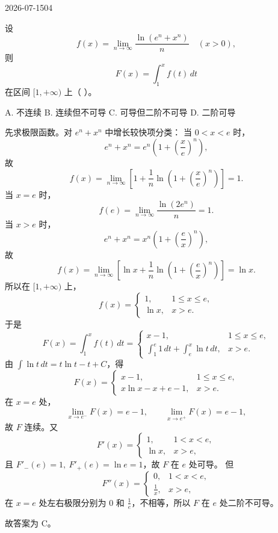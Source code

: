 \begin{mistake}{2026-07-15}{04}

\begin{problemcontent}
设
\[
f(x)=\lim_{n\to\infty}\frac{\ln(e^n+x^n)}{n}\quad (x>0),
\]
则
\[
F(x)=\int_1^x f(t)\,dt
\]
在区间 \([1,+\infty)\) 上（ ）。

A. 不连续 \quad
B. 连续但不可导 \quad
C. 可导但二阶不可导 \quad
D. 二阶可导
\end{problemcontent}

\begin{solutioncontent}
先求极限函数。对 \(e^n+x^n\) 中增长较快项分类：
当 \(0<x<e\) 时，
\[
e^n+x^n=e^n\left(1+\left(\frac{x}{e}\right)^n\right),
\]
故
\[
f(x)=\lim_{n\to\infty}\left[1+\frac1n\ln\left(1+\left(\frac{x}{e}\right)^n\right)\right]=1.
\]
当 \(x=e\) 时，
\[
f(e)=\lim_{n\to\infty}\frac{\ln(2e^n)}{n}=1.
\]
当 \(x>e\) 时，
\[
e^n+x^n=x^n\left(1+\left(\frac{e}{x}\right)^n\right),
\]
故
\[
f(x)=\lim_{n\to\infty}\left[\ln x+\frac1n\ln\left(1+\left(\frac{e}{x}\right)^n\right)\right]=\ln x.
\]
所以在 \([1,+\infty)\) 上，
\[
f(x)=
\begin{cases}
1,&1\le x\le e,\\
\ln x,&x>e.
\end{cases}
\]
于是
\[
F(x)=\int_1^x f(t)\,dt
=
\begin{cases}
x-1,&1\le x\le e,\\
\displaystyle \int_1^e1\,dt+\int_e^x\ln t\,dt,&x>e.
\end{cases}
\]
由 \(\int \ln t\,dt=t\ln t-t+C\)，得
\[
F(x)=
\begin{cases}
x-1,&1\le x\le e,\\
x\ln x-x+e-1,&x>e.
\end{cases}
\]
在 \(x=e\) 处，
\[
\lim_{x\to e^-}F(x)=e-1,\qquad
\lim_{x\to e^+}F(x)=e-1,
\]
故 \(F\) 连续。又
\[
F'(x)=
\begin{cases}
1,&1<x<e,\\
\ln x,&x>e,
\end{cases}
\]
且 \(F'_-(e)=1,\ F'_+(e)=\ln e=1\)，故 \(F\) 在 \(e\) 处可导。
但
\[
F''(x)=
\begin{cases}
0,&1<x<e,\\
\frac1x,&x>e,
\end{cases}
\]
在 \(x=e\) 处左右极限分别为 \(0\) 和 \(\frac1e\)，不相等，所以 \(F\) 在 \(e\) 处二阶不可导。

故答案为 \(\boxed{\text{C}}\)。
\end{solutioncontent}


\end{mistake}
